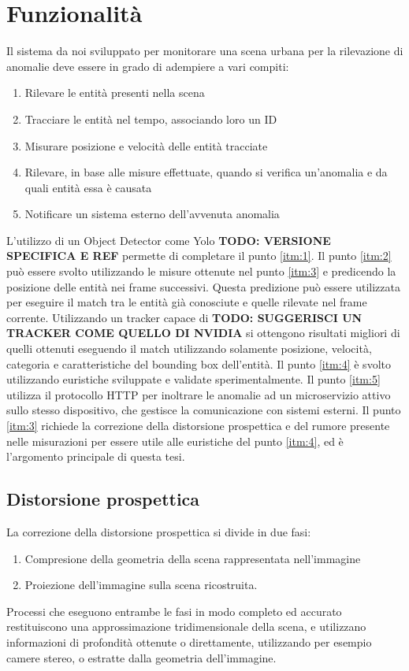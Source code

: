 \chapter{Funzionalità}
\label{sec:funzionalita}

Il sistema da noi sviluppato per monitorare una scena urbana per la rilevazione di anomalie deve essere in grado di adempiere a vari compiti:
\begin{enumerate}
    \item \label{itm:1} Rilevare le entità presenti nella scena
    \item \label{itm:2} Tracciare le entità nel tempo, associando loro un ID
    \item \label{itm:3} Misurare posizione e velocità delle entità tracciate
    \item \label{itm:4} Rilevare, in base alle misure effettuate, quando si verifica un'anomalia e da quali entità essa è causata
    \item \label{itm:5} Notificare un sistema esterno dell'avvenuta anomalia
\end{enumerate}

L'utilizzo di un Object Detector come Yolo \textbf{TODO: VERSIONE SPECIFICA E REF} permette di completare il punto \ref{itm:1}.
Il punto \ref{itm:2} può essere svolto utilizzando le misure ottenute nel punto \ref{itm:3} e predicendo la posizione delle entità nei frame successivi. 
Questa predizione può essere utilizzata per eseguire il match tra le entità già conosciute e quelle rilevate nel frame corrente. 
Utilizzando un tracker capace di \textbf{TODO: SUGGERISCI UN TRACKER COME QUELLO DI NVIDIA} si ottengono risultati migliori di quelli ottenuti eseguendo il match utilizzando solamente posizione, velocità, categoria e caratteristiche del bounding box dell'entità.
Il punto \ref{itm:4} è svolto utilizzando euristiche sviluppate e validate sperimentalmente. 
Il punto \ref{itm:5} utilizza il protocollo HTTP per inoltrare le anomalie ad un microservizio attivo sullo stesso dispositivo, che gestisce la comunicazione con sistemi esterni.
Il punto \ref{itm:3} richiede la correzione della distorsione prospettica e del rumore presente nelle misurazioni per essere utile alle euristiche del punto \ref{itm:4}, ed è l'argomento principale di questa tesi.

\section{Distorsione prospettica}
La correzione della distorsione prospettica si divide in due fasi:
\begin{enumerate}
    \item Compresione della geometria della scena rappresentata nell'immagine
    \item Proiezione dell'immagine sulla scena ricostruita.
\end{enumerate}
Processi che eseguono entrambe le fasi in modo completo ed accurato restituiscono una approssimazione tridimensionale della scena, e utilizzano informazioni di profondità ottenute o direttamente, utilizzando per esempio camere stereo, o estratte dalla geometria dell'immagine.

